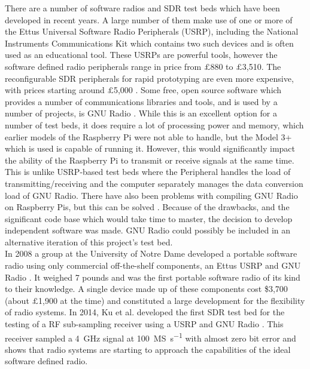 \documentclass[../main.tex]{subfiles}
\begin{document}
There are a number of software radios and SDR test beds which have been developed in recent years.
A large number of them make use of one or more of the Ettus Universal Software Radio Peripherals (USRP), including the National Instruments Communications Kit which contains two such devices and is often used as an educational tool.
These USRPs are powerful tools, however the software defined radio peripherals range in price from $\mathsterling$880 to $\mathsterling$3,510.
The reconfigurable SDR peripherals for rapid prototyping are even more expensive, with prices starting around $\mathsterling$5,000 \cite{web_NatIn}.
Some free, open source software which provides a number of communications libraries and tools, and is used by a number of projects, is GNU Radio \cite{web_GNURadio}.
While this is an excellent option for a number of test beds, it does require a lot of processing power and memory, which earlier models of the Raspberry Pi were not able to handle, but the Model 3+ which is used is capable of running it.
However, this would significantly impact the ability of the Raspberry Pi to transmit or receive signals at the same time.
This is unlike USRP-based test beds where the Peripheral handles the load of transmitting/receiving and the computer separately manages the data conversion load of GNU Radio.
There have also been problems with compiling GNU Radio on Raspberry Pis, but this can be solved \cite{web_GNUonRPi}.
Because of the drawbacks, and the significant code base which would take time to master, the decision to develop independent software was made.
GNU Radio could possibly be included in an alternative iteration of this project's test bed.\\

In 2008 a group at the University of Notre Dame developed a portable software radio using only commercial off-the-shelf components, an Ettus USRP and GNU Radio \cite{web_PortableSR}.
It weighed 7 pounds and was the first portable software radio of its kind to their knowledge.
A single device made up of these components cost \$3,700 (about $\mathsterling$1,900 at the time) and constituted a large development for the flexibility of radio systems.
In 2014, Ku et al. developed the first SDR test bed for the testing of a RF sub-sampling receiver using a USRP and GNU Radio  \cite{web_SDRTB_SubSamplingReceiver}.
This receiver sampled a \SI{4}{\giga\hertz} signal at \SI{100}{MS\per\second} with almost zero bit error and shows that radio systems are starting to approach the capabilities of the ideal software defined radio.\\
\end{document}
